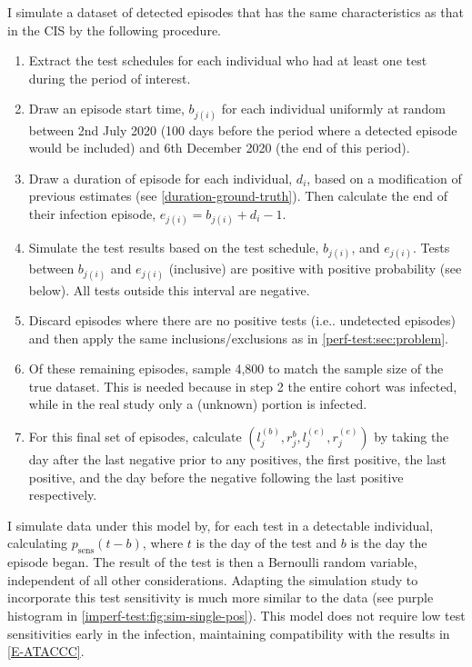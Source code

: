 \documentclass[12pt, letterpaper]{article} %
\makeatletter
\DeclareRobustCommand\onedot{\futurelet\@let@token\@onedot}
\def\@onedot{\ifx\@let@token.\else.\null\fi\xspace}
\def\ie{i.e\onedot} \def\Ie{\emph{I.e}\onedot}
\newcommand{\psens}{p_\text{sens}}
\makeatother
\begin{document}
I simulate a dataset of detected episodes that has the same characteristics as that in the CIS by the following procedure.
\begin{enumerate}
    \item Extract the test schedules for each individual who had at least one test during the period of interest.
    \item Draw an episode start time, $b_{j(i)}$ for each individual uniformly at random between 2nd July 2020 (100 days before the period where a detected episode would be included) and 6th December 2020 (the end of this period).
    \item Draw a duration of episode for each individual, $d_i$, based on a modification of previous estimates (see \cref{duration-ground-truth}). Then calculate the end of their infection episode, $e_{j(i)} = b_{j(i)} + d_i - 1$.
    \item Simulate the test results based on the test schedule, $b_{j(i)}$, and $e_{j(i)}$. Tests between $b_{j(i)}$ and $e_{j(i)}$ (inclusive) are positive with positive probability (see below). All tests outside this interval are negative.
    \item Discard episodes where there are no positive tests (\ie undetected episodes) and then apply the same inclusions/exclusions as in \cref{perf-test:sec:problem}.
    \item Of these remaining episodes, sample 4,800 to match the sample size of the true dataset. This is needed because in step 2 the entire cohort was infected, while in the real study only a (unknown) portion is infected.
    \item For this final set of episodes, calculate $(l_j^{(b)}, r_j^{b}, l_j^{(e)}, r_j^{(e)})$ by taking the day after the last negative prior to any positives, the first positive, the last positive, and the day before the negative following the last positive respectively.
\end{enumerate}

I simulate data under this model by, for each test in a detectable individual, calculating $\psens(t-b)$, where $t$ is the day of the test and $b$ is the day the episode began.
The result of the test is then a Bernoulli random variable, independent of all other considerations.
Adapting the simulation study to incorporate this test sensitivity is much more similar to the data (see purple histogram in \cref{imperf-test:fig:sim-single-pos}).
This model does not require low test sensitivities early in the infection, maintaining compatibility with the results in \cref{E-ATACCC}.
\end{document}
